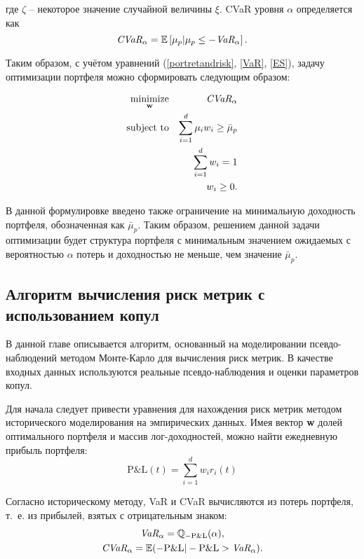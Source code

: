 \noindent где $\zeta$ -- некоторое значение случайной величины $\xi$. CVaR уровня $\alpha$ определяется как
%
\begin{equation} \label{ES}
    \emph{CVaR}_\alpha = \mathbb{E}\left[\mu_p | \mu_p \le -\emph{VaR}_\alpha \right].
\end{equation}

Таким образом, с учётом уравнений (\ref{portretandrisk}, \ref{VaR}, \ref{ES}), задачу оптимизации портфеля можно сформировать следующим образом:

\begin{eqnarray}\label{minES}
\underset{\textbf{w}}{\text{minimize}} & & \emph{CVaR}_\alpha \\
\text{subject to} & & \sum_{i=1}^d \mu_i w_i \ge \bar{\mu}_p \nonumber \\
& & \sum_{i=1}^d w_i = 1 \nonumber \\
& & w_i \ge 0. \nonumber
\end{eqnarray}

В данной формулировке введено также ограничение на минимальную доходность портфеля, обозначенная как $\bar{\mu}_p$.
Таким образом, решением данной задачи оптимизации будет структура портфеля с минимальным значением ожидаемых с вероятностью $\alpha$ потерь и доходностью не меньше, чем значение $\bar{\mu}_p$.

\subsection{Алгоритм вычисления риск метрик с использованием копул}

В данной главе описывается алгоритм, основанный на моделировании псевдо-наблюдений методом Монте-Карло для вычисления риск метрик. 
В качестве входных данных используются реальные псевдо-наблюдения и оценки параметров копул.

Для начала следует привести уравнения для нахождения риск метрик методом исторического моделирования на эмпирических данных. 
Имея вектор \textbf{w} долей оптимального портфеля и массив лог-доходностей, можно найти ежедневную прибыль портфеля:
%
\begin{equation} \label{PnL}
    \text{P\&L}(t) = \sum_{i=1}^d w_i r_i(t)
\end{equation}

Согласно историческому методу, VaR и CVaR вычисляются из потерь портфеля, т.~е. из прибылей, взятых с отрицательным знаком:
\begin{gather}
    \emph{VaR}_\alpha = \mathbb{Q}_{-\text{P\&L}}  (\alpha),
    \label{VaR-hist} \\
	\emph{CVaR}_\alpha = \mathbb{E} (-\text{P\&L}|-\text{P\&L} > \emph{VaR}_\alpha).
	\label{ES-hist}
\end{gather}

